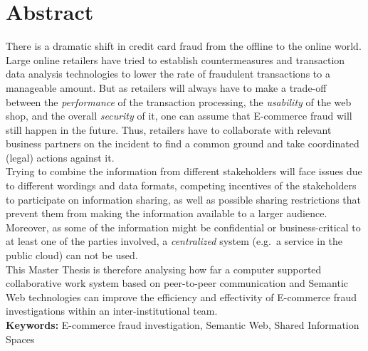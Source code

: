 
\chapter*{Abstract}

There is a dramatic shift in credit card fraud from the offline to the online world. Large online retailers have tried to establish countermeasures and transaction data analysis technologies to lower the rate of fraudulent transactions to a manageable amount. But as retailers will always have to make a trade-off between the \emph{performance} of the transaction processing, the \emph{usability} of the web shop, and the overall \emph{security} of it, one can assume that \gls{E-commerce} fraud will still happen in the future. Thus, retailers have to collaborate with relevant business partners on the incident to find a common ground and take coordinated (legal) actions against it. \\

Trying to combine the information from different stakeholders will face issues due to different wordings and data formats, competing incentives of the stakeholders to participate on information sharing, as well as possible sharing restrictions that prevent them from making the information available to a larger audience. Moreover, as some of the information might be confidential or business-critical to at least one of the parties involved, a \emph{centralized} system (e.g.\ a service in the public cloud) can not be used. \\

This Master Thesis is therefore analysing how far a computer supported collaborative work system based on peer-to-peer communication and Semantic Web technologies can improve the efficiency and effectivity of \gls{E-commerce} fraud investigations within an inter-institutional team. \\[2em]

\textbf{Keywords:} \gls{E-commerce} fraud investigation, Semantic Web, Shared Information Spaces

